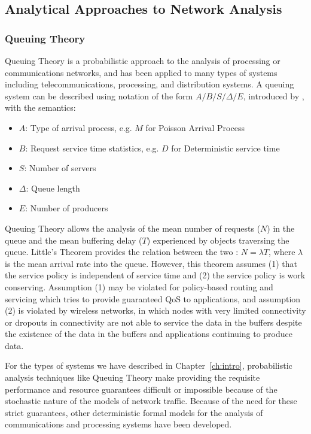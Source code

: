 \subsection{Analytical Approaches to Network Analysis}
\label{subsec:related_part1_analytics}

\subsubsection{Queuing Theory}
Queuing Theory\cite{QT_Kendall1953}\cite{QT_Giambene2005} is a
probabilistic approach to the analysis of processing or communications
networks, and has been applied to many types of systems including
telecommunications, processing, and distribution systems.  A queuing
system can be described using notation of the form $A/B/S/\Delta/E$,
introduced by \cite{QT_Kendall1953}, with the semantics:
\begin{itemize}
	\item $A$: Type of arrival process, e.g. $M$ for Poisson Arrival Process
	\item $B$: Request service time statistics, e.g. $D$ for Deterministic service time
	\item $S$: Number of servers
	\item $\Delta$: Queue length
	\item $E$: Number of producers
\end{itemize}

Queuing Theory allows the analysis of the mean number of requests
($N$) in the queue and the mean buffering delay ($T$) experienced by
objects traversing the queue.  Little's Theorem provides the relation
between the two : $N=\lambda T$\cite{littleTheorem}, where $\lambda$
is the mean arrival rate into the queue.  However, this theorem
assumes (1) that the service policy is independent of service time and
(2) the service policy is work conserving.  Assumption (1) may be
violated for policy-based routing and servicing which tries to provide
guaranteed QoS to applications, and assumption (2) is violated by
wireless networks, in which nodes with very limited connectivity or
dropouts in connectivity are not able to service the data in the
buffers despite the existence of the data in the buffers and
applications continuing to produce data.

For the types of systems we have described in Chapter~\ref{ch:intro},
probabilistic analysis techniques like Queuing Theory make providing
the requisite performance and resource guarantees difficult or
impossible because of the stochastic nature of the models of network
traffic\cite{NC_Cruz1991}.  Because of the need for these strict
guarantees, other deterministic formal models for the analysis of
communications and processing systems have been developed.

